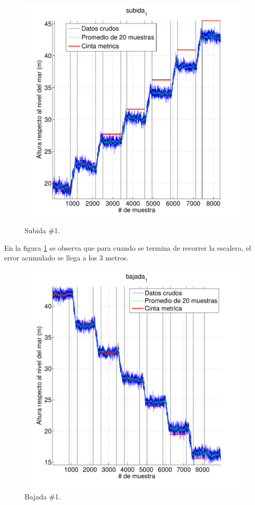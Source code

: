 \documentclass[spanish,12pt,a4paper,titlepage]{report}
\begin{document}
\vspace{-12pt}
\begin{figure}[h!]
\centering
  \includegraphics[width=.80\textwidth]{./pics/metros-s1.pdf}
\vspace{-15pt}
  \caption{Subida \#1.}
  \label{fig:metros-s1.pdf}
\end{figure}
\vspace{-15pt}

En la figura \ref{fig:metros-s1.pdf} se observa que para cuando se termina de recorrer la escalera, el error acumulado se llega a los 3 metros.

\newpage
\vspace{-40pt}
\begin{figure}[h!]
\centering
  \includegraphics[width=.85\textwidth]{./pics/metros-b1.pdf}
\vspace{-25pt}
  \caption{Bajada \#1.}
  \label{fig:metros-b1.pdf}
\end{figure}
\end{document}
